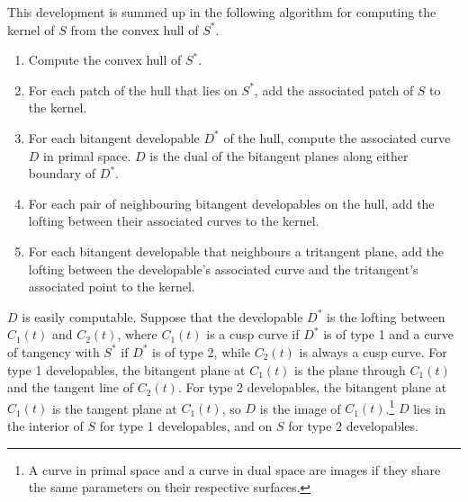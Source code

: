 \documentclass[12pt]{article}
\begin{document}
This development is summed up in the following algorithm for computing the kernel of $S$ 
from the convex hull of $S^*$.

\begin{enumerate}
\item Compute the convex hull of $S^*$.
\item For each patch of the hull that lies on $S^*$, add the associated patch of $S$
	to the kernel.
\item For each bitangent developable $D^*$ of the hull, compute the associated curve $D$ in primal space.
	$D$ is the dual of the bitangent planes along either boundary of $D^*$.
\item For each pair of neighbouring bitangent developables on the hull,
	add the lofting between their associated curves to the kernel.
\item For each bitangent developable that neighbours a tritangent plane,
	add the lofting between the developable's associated curve and the tritangent's 
	associated point to the kernel.
\end{enumerate}

$D$ is easily computable.
Suppose that the developable $D^*$ is the lofting between $C_1(t)$ and $C_2(t)$,
where $C_1(t)$ is a cusp curve if $D^*$ is of type 1 and
a curve of tangency with $S^*$ if $D^*$ is of type 2,
while $C_2(t)$ is always a cusp curve.
For type 1 developables, the bitangent plane at $C_1(t)$ is the plane through
$C_1(t)$ and the tangent line of $C_2(t)$.
For type 2 developables, the bitangent plane at $C_1(t)$ is the tangent plane
at $C_1(t)$, so $D$ is the image of $C_1(t)$.\footnote{A curve in primal
	space and a curve in dual space are images if they share the same
	parameters on their respective surfaces.}
$D$ lies in the interior of $S$ for type 1 developables,
and on $S$ for type 2 developables.

\end{document}
